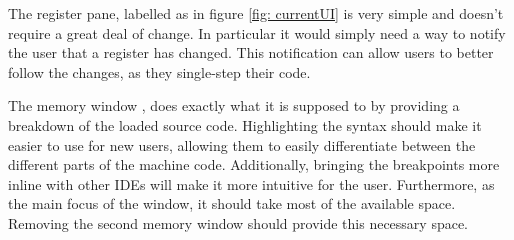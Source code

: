 The register pane, labelled as  in figure \ref{fig: currentUI} is very simple and doesn't require a great deal of change. In particular it would simply need a way to notify the user that a register has changed. This notification can allow users to better follow the changes, as they single-step their code.

The memory window , does exactly what it is supposed to by providing a breakdown of the loaded source code. Highlighting the syntax should make it easier to use for new users, allowing them to easily differentiate between the different parts of the machine code. Additionally, bringing the breakpoints more inline with other IDEs will make it more intuitive for the user. Furthermore, as the main focus of the window, it should take most of the available space. Removing the second memory window should provide this necessary space.

